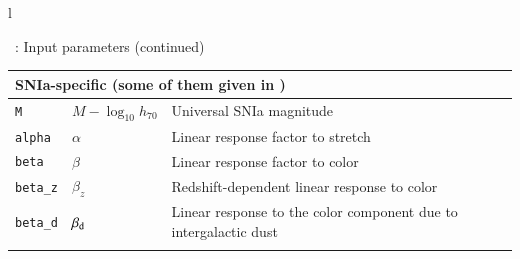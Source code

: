 \documentclass[11pt, chapterprefix, headsepline]{scrartcl}
\begin{document}
\begin{longtable}{l}
 
\begin{minipage}{\textwidth}
  \centerline{\tablename\ \thetable{}: Input parameters (continued)}
\begin{tabularx}{\textwidth}{llX}
  \\
 \hline \multicolumn{3}{l}{\rul SNIa-specific \quad (some of them given in \file{cosmo\_SN.par})} \\ \hline
  \texttt{M}         & $M - \log_{10} h_{70}$ & Universal SNIa magnitude \\
  \texttt{alpha}     & $\alpha$  & Linear response factor to stretch \\
  \texttt{beta}      & $\beta$   & Linear response factor to color \\
  \texttt{beta\_z}   & $\beta_z$ & Redshift-dependent linear response to color \\
  \texttt{beta\_d}   & $\beta_{\rm d}$ & Linear response to the color
  component due to intergalactic dust \\ \\
  \end{tabularx}
  \end{minipage}
\\


\end{longtable}
\end{document}
